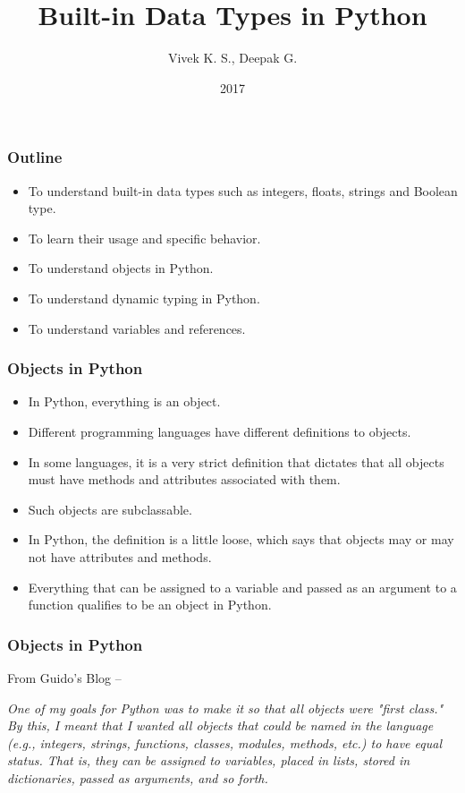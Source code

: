 \documentclass{beamer}
\title{Built-in Data Types in Python}
\author{Vivek K. S., Deepak G.}
\institute{Information Systems Decision Sciences (ISDS)\\
MUMA College of Business\\
University of South Florida \\
Tampa, Florida}
\date{2017}
\begin{document}
 
\frame{\titlepage}
 
\begin{frame}
\frametitle{Outline}

\begin{itemize}
\item To understand built-in data types such as integers, floats, strings and Boolean type.
\item To learn their usage and specific behavior.
\item To understand objects in Python.
\item To understand dynamic typing in Python.
\item To understand variables and references.
\end{itemize}
\end{frame}

\begin{frame}
\frametitle{Objects in Python}
\begin{itemize}
\item In Python, everything is an object.
\item Different programming languages have different definitions to objects.
\item In some languages, it is a very strict definition that dictates that all objects must have methods and attributes associated with them.
\item Such objects are subclassable.
\item In Python, the definition is a little loose, which says that objects may or may not have attributes and methods.
\item Everything that can be assigned to a variable and passed as an argument to a function qualifies to be an object in Python.
\end{itemize}
\end{frame}

\begin{frame}
\frametitle{Objects in Python}
From Guido's Blog --

\textit{One of my goals for Python was to make it so that all objects were "first class." By this, I meant that I wanted all objects that could be named in the language (e.g., integers, strings, functions, classes, modules, methods, etc.) to have equal status. That is, they can be assigned to variables, placed in lists, stored in dictionaries, passed as arguments, and so forth.}
\end{frame}
\end{document}
